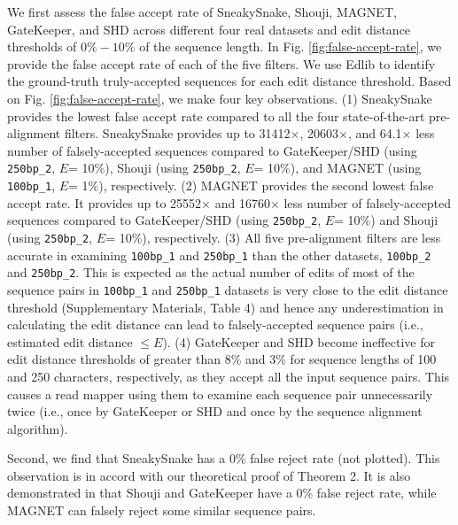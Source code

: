 {We first assess the false accept rate of SneakySnake, Shouji, MAGNET, GateKeeper, and SHD across different four real datasets and edit distance thresholds of $0\%-10\%$ of the sequence length. In Fig. \ref{fig:false-accept-rate}, 
we provide the false accept rate of each of the five filters.
We use Edlib to identify the ground{-}truth truly-accepted sequences for each edit distance threshold. Based on Fig. \ref{fig:false-accept-rate}, we make four key observations. 
(1) SneakySnake provides the lowest false accept rate compared to all the four state-of-the-art pre-alignment filters. 
SneakySnake provides up to 31412$\times$, 20603$\times$, and 64.1$\times$ less number of falsely-accepted sequences compared to GateKeeper/SHD (using \texttt{250bp\_2}, $E$= 10\%), Shouji (using \texttt{250bp\_2}, $E$= 10\%), and MAGNET (using \texttt{100bp\_1}, $E$= 1\%), respectively.
(2) MAGNET provides the second lowest false accept rate. It provides up to 25552$\times$ and 16760$\times$ less number of falsely-accepted sequences compared to GateKeeper/SHD (using \texttt{250bp\_2}, $E$= 10\%) and Shouji (using \texttt{250bp\_2}, $E$= 10\%), respectively.
(3) All five pre-alignment filters are less accurate in examining \texttt{100bp\_1} and \texttt{250bp\_1} than the other datasets, \texttt{100bp\_2} and \texttt{250bp\_2}. {This is expected as the actual number of edits of most of the sequence pairs in \texttt{100bp\_1} and \texttt{250bp\_1} datasets is very close to the edit distance threshold (Supplementary Materials, Table 4) and hence any underestimation in calculating the edit distance can lead to {falsely{-}accepted sequence pairs (i.e.,} estimated edit distance} $\leq E$).
(4) GateKeeper and SHD become ineffective for edit distance thresholds of greater than 8\% and 3\% for sequence lengths of 100 and 250 characters, respectively, as they accept all the input sequence pairs. 
This causes {a read mapper using} them to examine each sequence pair unnecessarily twice (i.e., once by GateKeeper or SHD and once by the sequence alignment algorithm).

Second, we {find that} SneakySnake {has} a 0\% false reject rate {(not plotted)}. {This observation is in accord with our theoretical proof of Theorem 2.}
It is also demonstrated in \citep{alser2019shouji} that Shouji and GateKeeper have a 0\% false reject rate, while MAGNET can falsely reject some similar sequence pairs.

}
